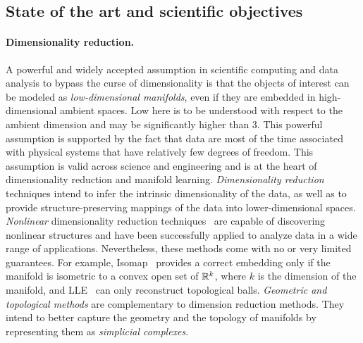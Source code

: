 \subsection{State of the art and scientific objectives}

\paragraph{Dimensionality reduction.} A powerful and widely accepted assumption in scientific computing and data analysis to bypass the curse of dimensionality is that the objects of interest can be modeled as {\em low-dimensional manifolds}, even if they are embedded in high-dimensional ambient spaces. Low here is to be understood with respect to the ambient dimension and may be significantly higher than 3. This powerful assumption is supported by the fact that data are most of the time associated with physical systems that have relatively few degrees of freedom.  This assumption is valid across science and engineering and is at the heart of dimensionality reduction and manifold learning.
{\em Dimensionality reduction} techniques intend to infer the intrinsic dimensionality of the data, as well as to provide structure-preserving mappings of the data into lower-dimensional spaces. {\em Nonlinear} dimensionality reduction techniques~\cite{lv-nldr-2007} are capable of discovering {nonlinear} structures and have been successfully applied to analyze data in a wide range of applications.
Nevertheless, these methods come with no or very limited guarantees. For example, Isomap~\cite{tsl-isomap-2000} provides a correct embedding only if the manifold is isometric to a convex open set of $\mathbb R ^k$, where $k$ is the dimension of the manifold, and LLE~\cite{rs-lle-2000} can only reconstruct topological balls. {\em Geometric and topological methods} are complementary to dimension reduction methods. They intend to better capture the geometry and the topology of manifolds by representing them as {\em simplicial complexes}.



